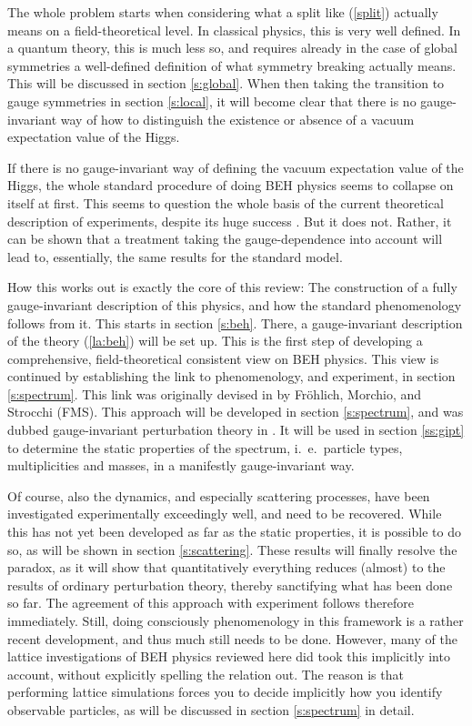 \documentclass[final,twoside,12pt]{article}
\newcommand*{\pref}[1]{(\ref{#1})}
\newcommand*{\1}{1\!\!\!\bot}
\begin{document}
The whole problem starts when considering what a split like \pref{split} actually means on a field-theoretical level. In classical physics, this is very well defined. In a quantum theory, this is much less so, and requires already in the case of global symmetries a well-defined definition of what symmetry breaking actually means. This will be discussed in section \ref{s:global}. When then taking the transition to gauge symmetries in section \ref{s:local}, it will become clear that there is no gauge-invariant way of how to distinguish the existence or absence of a vacuum expectation value of the Higgs.

If there is no gauge-invariant way of defining the vacuum expectation value of the Higgs, the whole standard procedure \cite{Bohm:2001yx} of doing BEH physics seems to collapse on itself at first. This seems to question the whole basis of the current theoretical description of experiments, despite its huge success \cite{pdg}. But it does not. Rather, it can be shown that a treatment taking the gauge-dependence into account will lead to, essentially, the same results for the standard model.

How this works out is exactly the core of this review: The construction of a fully gauge-invariant description of this physics, and how the standard phenomenology follows from it. This starts in section \ref{s:beh}. There, a gauge-invariant description of the theory \pref{la:beh} will be set up. This is the first step of developing a comprehensive, field-theoretical consistent view on BEH physics. This view is continued by establishing the link to phenomenology, and experiment, in section \ref{s:spectrum}. This link was originally devised in \cite{Frohlich:1980gj,Frohlich:1981yi} by Fr\"ohlich, Morchio, and Strocchi (FMS). This approach will be developed in section \ref{s:spectrum}, and was dubbed gauge-invariant perturbation theory in \cite{Seiler:2015rwa}. It will be used in section \ref{ss:gipt} to determine the static properties of the spectrum, i.\ e.\ particle types, multiplicities and masses, in a manifestly gauge-invariant way.

Of course, also the dynamics, and especially scattering processes, have been investigated experimentally exceedingly well, and need to be recovered. While this has not yet been developed as far as the static properties, it is possible to do so, as will be shown in section \ref{s:scattering}. These results will finally resolve the paradox, as it will show that quantitatively everything reduces (almost) to the results of ordinary perturbation theory, thereby sanctifying what has been done so far. The agreement of this approach with experiment follows therefore immediately. Still, doing consciously phenomenology in this framework is a rather recent development, and thus much still needs to be done. However, many of the lattice investigations of BEH physics reviewed here did took this implicitly into account, without explicitly spelling the relation out. The reason is that performing lattice simulations forces you to decide implicitly how you identify observable particles, as will be discussed in section \ref{s:spectrum} in detail.
\end{document}
